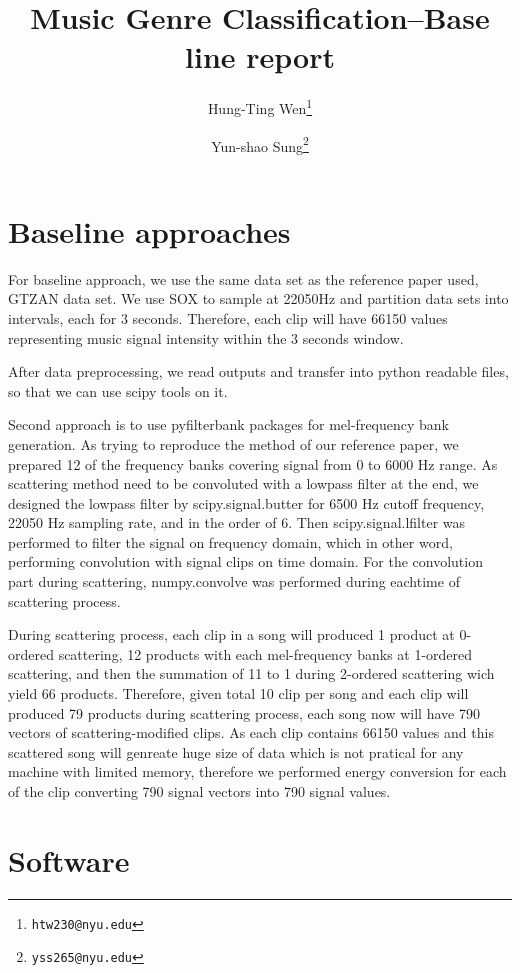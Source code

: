 \documentclass[final]{siamltexmm}
\title{Music Genre Classification--Base line report}
\author{Hung-Ting Wen\thanks{\tt htw230@nyu.edu}
        \and Yun-shao Sung\thanks{\tt yss265@nyu.edu}}
\begin{document}
\maketitle

\pagestyle{myheadings}
\thispagestyle{plain}

\section{Baseline approaches}
For baseline approach, we use the same data set as the reference paper used, GTZAN data set.  We use SOX to sample at 22050Hz and partition data sets into intervals, each for 3 seconds.  Therefore, each clip will have 66150 values representing music signal intensity within the 3 seconds window.

After data preprocessing, we read outputs and transfer into python readable files, so that we can use scipy tools on it.

Second approach is to use pyfilterbank packages for mel-frequency bank generation.  As trying to reproduce the method of our reference paper, we prepared 12 of the frequency banks covering signal from 0 to 6000 Hz range.  As scattering method need to be convoluted with a lowpass filter at the end, we designed the lowpass filter by scipy.signal.butter for 6500 Hz cutoff frequency, 22050 Hz sampling rate, and in the order of 6. Then scipy.signal.lfilter was performed to filter the signal on frequency domain, which in other word, performing convolution with signal clips on time domain. For the convolution part during scattering, numpy.convolve was performed during eachtime of scattering process.

During scattering process, each clip in a song will produced 1 product at 0-ordered scattering, 12 products with each mel-frequency banks at 1-ordered scattering, and then the summation of 11 to 1 during 2-ordered scattering wich yield 66 products. Therefore, given total 10 clip per song and each clip will produced 79 products during scattering process, each song now will have 790 vectors of scattering-modified clips. As each clip contains 66150 values and this scattered song will genreate huge size of data which is not pratical for any machine with limited memory, therefore we performed energy conversion for each of the clip converting 790 signal vectors into 790 signal values.

\section{Software}
\end{document}
